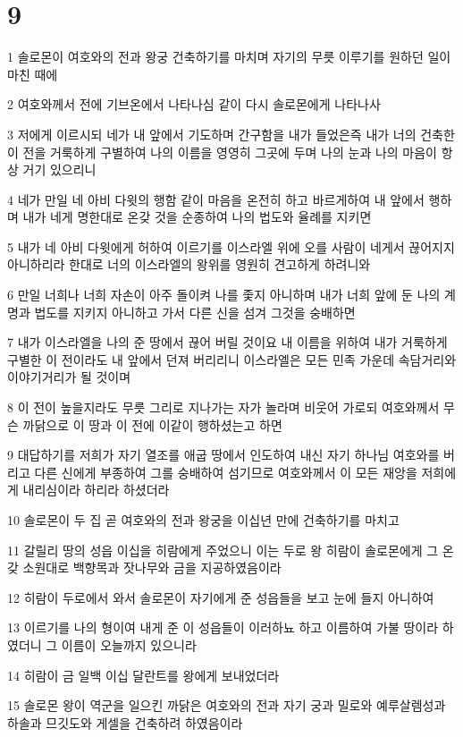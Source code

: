 \chapter{9}

\par 1 솔로몬이 여호와의 전과 왕궁 건축하기를 마치며 자기의 무릇 이루기를 원하던 일이 마친 때에
\par 2 여호와께서 전에 기브온에서 나타나심 같이 다시 솔로몬에게 나타나사
\par 3 저에게 이르시되 네가 내 앞에서 기도하며 간구함을 내가 들었은즉 내가 너의 건축한 이 전을 거룩하게 구별하여 나의 이름을 영영히 그곳에 두며 나의 눈과 나의 마음이 항상 거기 있으리니
\par 4 네가 만일 네 아비 다윗의 행함 같이 마음을 온전히 하고 바르게하여 내 앞에서 행하며 내가 네게 명한대로 온갖 것을 순종하여 나의 법도와 율례를 지키면
\par 5 내가 네 아비 다윗에게 허하여 이르기를 이스라엘 위에 오를 사람이 네게서 끊어지지 아니하리라 한대로 너의 이스라엘의 왕위를 영원히 견고하게 하려니와
\par 6 만일 너희나 너희 자손이 아주 돌이켜 나를 좇지 아니하며 내가 너희 앞에 둔 나의 계명과 법도를 지키지 아니하고 가서 다른 신을 섬겨 그것을 숭배하면
\par 7 내가 이스라엘을 나의 준 땅에서 끊어 버릴 것이요 내 이름을 위하여 내가 거룩하게 구별한 이 전이라도 내 앞에서 던져 버리리니 이스라엘은 모든 민족 가운데 속담거리와 이야기거리가 될 것이며
\par 8 이 전이 높을지라도 무릇 그리로 지나가는 자가 놀라며 비웃어 가로되 여호와께서 무슨 까닭으로 이 땅과 이 전에 이같이 행하셨는고 하면
\par 9 대답하기를 저희가 자기 열조를 애굽 땅에서 인도하여 내신 자기 하나님 여호와를 버리고 다른 신에게 부종하여 그를 숭배하여 섬기므로 여호와께서 이 모든 재앙을 저희에게 내리심이라 하리라 하셨더라
\par 10 솔로몬이 두 집 곧 여호와의 전과 왕궁을 이십년 만에 건축하기를 마치고
\par 11 갈릴리 땅의 성읍 이십을 히람에게 주었으니 이는 두로 왕 히람이 솔로몬에게 그 온갖 소원대로 백향목과 잣나무와 금을 지공하였음이라
\par 12 히람이 두로에서 와서 솔로몬이 자기에게 준 성읍들을 보고 눈에 들지 아니하여
\par 13 이르기를 나의 형이여 내게 준 이 성읍들이 이러하뇨 하고 이름하여 가불 땅이라 하였더니 그 이름이 오늘까지 있으니라
\par 14 히람이 금 일백 이십 달란트를 왕에게 보내었더라
\par 15 솔로몬 왕이 역군을 일으킨 까닭은 여호와의 전과 자기 궁과 밀로와 예루살렘성과 하솔과 므깃도와 게셀을 건축하려 하였음이라

